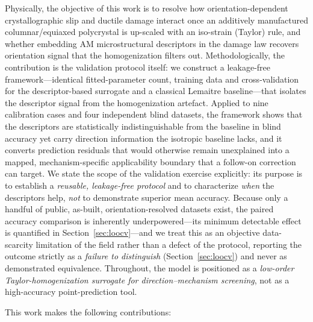 \documentclass[twocolumn]{sagej}
\begin{document}
Physically, the objective of this work is to resolve how orientation-dependent crystallographic slip and ductile damage interact once an additively manufactured columnar/equiaxed polycrystal is up-scaled with an iso-strain (Taylor) rule, and whether embedding AM microstructural descriptors in the damage law recovers orientation signal that the homogenization filters out. Methodologically, the contribution is the validation protocol itself: we construct a leakage-free framework---identical fitted-parameter count, training data and cross-validation for the descriptor-based surrogate and a classical Lemaitre baseline---that isolates the descriptor signal from the homogenization artefact. Applied to nine calibration cases and four independent blind datasets, the framework shows that the descriptors are statistically indistinguishable from the baseline in blind accuracy yet carry direction information the isotropic baseline lacks, and it converts prediction residuals that would otherwise remain unexplained into a mapped, mechanism-specific applicability boundary that a follow-on correction can target. We state the scope of the validation exercise explicitly: its purpose is to establish a \emph{reusable, leakage-free protocol} and to characterize \emph{when} the descriptors help, \emph{not} to demonstrate superior mean accuracy. Because only a handful of public, as-built, orientation-resolved datasets exist, the paired accuracy comparison is inherently underpowered---its minimum detectable effect is quantified in Section~\ref{sec:loocv}---and we treat this as an objective data-scarcity limitation of the field rather than a defect of the protocol, reporting the outcome strictly as a \emph{failure to distinguish} (Section~\ref{sec:loocv}) and never as demonstrated equivalence. Throughout, the model is positioned as a \emph{low-order Taylor-homogenization surrogate for direction--mechanism screening}, not as a high-accuracy point-prediction tool.

This work makes the following contributions:
\end{document}
